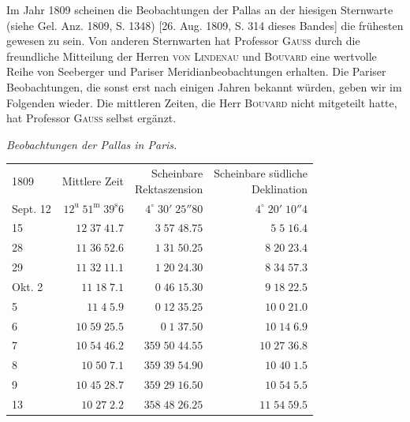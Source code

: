 \par\indent Im Jahr 1809 scheinen die Beobachtungen der Pallas an der hiesigen Sternwarte (siehe Gel. Anz. 1809, S. 1348) [26. Aug. 1809, S. 314 dieses Bandes] die frühesten gewesen zu sein. Von anderen Sternwarten hat Professor \textsc{Gauss} durch die freundliche Mitteilung der Herren \textsc{von Lindenau} und \textsc{Bouvard} eine wertvolle Reihe von Seeberger und Pariser Meridianbeobachtungen erhalten. Die Pariser Beobachtungen, die sonst erst nach einigen Jahren bekannt würden, geben wir im Folgenden wieder. Die mittleren Zeiten, die Herr \textsc{Bouvard} nicht mitgeteilt hatte, hat Professor \textsc{Gauss} selbst ergänzt.

\begin{center}\emph{Beobachtungen der Pallas in Paris.}\end{center}
\begin{center}\fontsize{9}{11}\selectfont\setlength{\tabcolsep}{5pt}\renewcommand{\arraystretch}{1.0}\begin{tabular}{lrrr}
1809 & Mittlere Zeit & \shortstack{Scheinbare\\Rektaszension} & \shortstack{Scheinbare südliche\\Deklination}\\
Sept. 12 & $12^{\text{u}}\;51^{\text{m}}\;39^{\text{s}}6$ & $4^\circ\;30'\;25''80$ & $4^\circ\;20'\;10''4$\\
15 & $12\;37\;41.7$ & $3\;57\;48.75$ & $5\;5\;16.4$\\
28 & $11\;36\;52.6$ & $1\;31\;50.25$ & $8\;20\;23.4$\\
29 & $11\;32\;11.1$ & $1\;20\;24.30$ & $8\;34\;57.3$\\
Okt. 2 & $11\;18\;7.1$ & $0\;46\;15.30$ & $9\;18\;22.5$\\
5 & $11\;4\;5.9$ & $0\;12\;35.25$ & $10\;0\;21.0$\\
6 & $10\;59\;25.5$ & $0\;1\;37.50$ & $10\;14\;6.9$\\
7 & $10\;54\;46.2$ & $359\;50\;44.55$ & $10\;27\;36.8$\\
8 & $10\;50\;7.1$ & $359\;39\;54.90$ & $10\;40\;1.5$\\
9 & $10\;45\;28.7$ & $359\;29\;16.50$ & $10\;54\;5.5$\\
13 & $10\;27\;2.2$ & $358\;48\;26.25$ & $11\;54\;59.5$\\
\end{tabular}\end{center}

